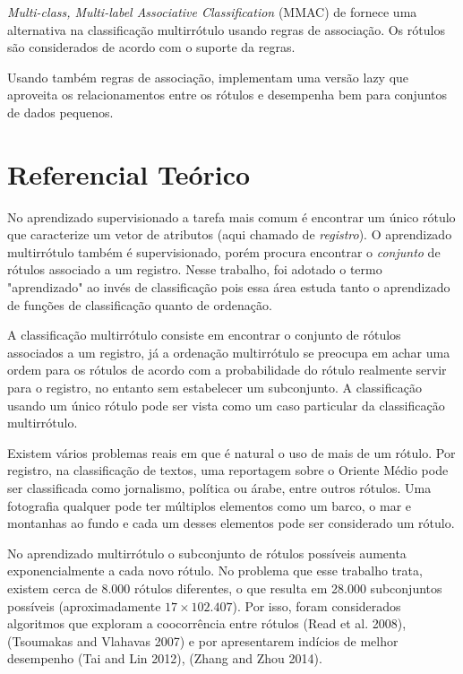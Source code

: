 \documentclass[runningheads,a4paper]{llncs}
\begin{document}
\textit{Multi-class, Multi-label Associative Classification} (MMAC) de \cite{Thabtah2004-vz} fornece uma alternativa na classificação multirrótulo usando regras de associação. Os rótulos são considerados de acordo com o suporte da regras.

Usando também regras de associação, \cite{Veloso2007-el} implementam uma versão lazy que aproveita os relacionamentos entre os rótulos e desempenha bem para conjuntos de dados pequenos.

\section{Referencial Teórico}\label{sec:refteo}

No aprendizado supervisionado a tarefa mais comum é encontrar um único rótulo que  caracterize um vetor de atributos (aqui chamado de \emph{registro}). O aprendizado multirrótulo também é supervisionado, porém procura encontrar o \emph{conjunto} de rótulos associado a um registro. Nesse trabalho, foi adotado o termo "aprendizado" ao invés de classificação pois essa área estuda tanto o aprendizado de funções de classificação quanto de ordenação\cite{Zhang2014-be}.

A classificação multirrótulo consiste em encontrar o conjunto de rótulos associados a um registro, já a ordenação multirrótulo se preocupa em achar uma ordem para os rótulos de acordo com a probabilidade do rótulo realmente servir para o registro, no entanto sem estabelecer um subconjunto. A classificação usando um único rótulo pode ser vista como um caso particular da classificação multirrótulo.

Existem vários problemas reais em que é natural o uso de mais de um rótulo. Por registro, na classificação de textos, uma reportagem sobre o Oriente Médio pode ser classificada como jornalismo, política ou árabe, entre outros rótulos. Uma fotografia qualquer pode ter múltiplos elementos como um barco, o mar e montanhas ao fundo e cada um desses elementos pode ser considerado um rótulo.

No aprendizado multirrótulo o subconjunto de rótulos possíveis aumenta exponencialmente a cada novo rótulo. No problema que esse trabalho trata, existem cerca de 8.000 rótulos diferentes, o que resulta em 28.000 subconjuntos possíveis (aproximadamente $17 \times 102.407$). Por isso, foram considerados algoritmos que exploram a coocorrência entre rótulos (Read et al. 2008), (Tsoumakas and Vlahavas 2007) e por apresentarem indícios de melhor desempenho (Tai and Lin 2012), (Zhang and Zhou 2014). 
\end{document}

